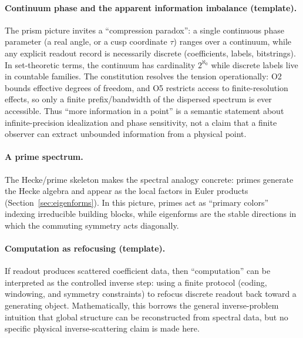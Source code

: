 \paragraph{Continuum phase and the apparent information imbalance (template).}
The prism picture invites a ``compression paradox'': a single continuous phase parameter (a real angle, or a cusp coordinate $\tau$) ranges over a continuum, while any explicit readout record is necessarily discrete (coefficients, labels, bitstrings). In set-theoretic terms, the continuum has cardinality $2^{\aleph_0}$ while discrete labels live in countable families. The constitution resolves the tension operationally: O2 bounds effective degrees of freedom, and O5 restricts access to finite-resolution effects, so only a finite prefix/bandwidth of the dispersed spectrum is ever accessible. Thus ``more information in a point'' is a semantic statement about infinite-precision idealization and phase sensitivity, not a claim that a finite observer can extract unbounded information from a physical point.

\paragraph{A prime spectrum.}
The Hecke/prime skeleton makes the spectral analogy concrete: primes generate the Hecke algebra and appear as the local factors in Euler products (Section~\ref{sec:eigenforms}). In this picture, primes act as ``primary colors'' indexing irreducible building blocks, while eigenforms are the stable directions in which the commuting symmetry acts diagonally.

\paragraph{Computation as refocusing (template).}
If readout produces scattered coefficient data, then ``computation'' can be interpreted as the controlled inverse step: using a finite protocol (coding, windowing, and symmetry constraints) to refocus discrete readout back toward a generating object. Mathematically, this borrows the general inverse-problem intuition that global structure can be reconstructed from spectral data, but no specific physical inverse-scattering claim is made here.


